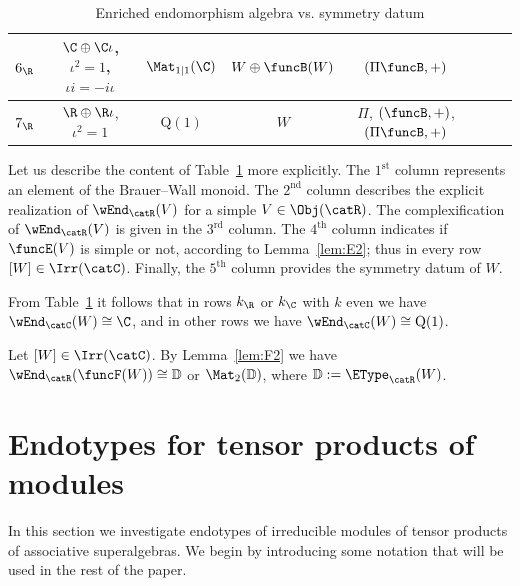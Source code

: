 \documentclass[12pt]{amsart}
\begin{document}
\begin{thm}
\begin{table}[ht]
\begin{tabular}{|c|c|c|c|c|c|c|c|}
\hline $6_\R$ & $\C\oplus\C\iota$, $\iota^2=1$, $\iota i=-i\iota$ & 
{$\Mat_{1|1}(\C)$} & $W\oplus \funcB(W)$ & 
{$(\Pi \funcB,+)$} \\

\hline $7_\R$ & $\R\oplus\R\iota$, $\iota^2=1$ & $\mathrm Q(1)$ & $W$ & $\Pi$, $(\funcB,+)$, 
$(\Pi\funcB,+)$
\\
\hline
\end{tabular}
\vspace{3mm}

\caption{\label{Table-1} Enriched endomorphism algebra vs. symmetry datum}
\vspace{-8mm}
\end{table}
\end{thm}




\begin{rmk}
Let us describe the content of Table~\ref{Table-1} more explicitly. The $1^\mathrm{st}$  column represents an element  of
the Brauer--Wall monoid.  The $2^\mathrm{nd}$ column describes the explicit realization of $\wEnd_\catR(V)$ for a simple $V\in\Obj(\catR)$. The   
complexification of $\wEnd_\catR(V)$ is given in the $3^\mathrm{rd}$ column. The $4^\mathrm{th}$ column
indicates if $\funcE(V)$ is simple or not, according to  Lemma~\ref{lem:E2}; thus in every row  $[W]\in\Irr(\catC)$. 
Finally, the $5^\mathrm{th}$ column provides the symmetry datum of $W$.  \end{rmk}




\begin{rmk}
\label{rmk:End(W)}
From Table~\ref{Table-1} it follows that in rows $k_\R$ or $k_\C$ with $k$ even we have $\wEnd_\catC(W)\cong \C$, and in other rows we have  
$\wEnd_\catC(W)\cong \mathrm{Q}(1)$.
\end{rmk}



\begin{rmk}
\label{rmk:endoDM2D}
Let  
$[W]\in\Irr(\catC)$. 
By Lemma~\ref{lem:F2} we have  $\wEnd_{\catR}(\funcF(W))\cong \mathbb D$ or $\Mat_2(\mathbb D)$, where  
$\mathbb D:=\EType_\catR(W)$. 
\end{rmk}






\section{Endotypes for tensor products of modules}
\label{sec:E-types-module}
In this section we investigate endotypes of  irreducible modules of  tensor products of  associative superalgebras. We begin by introducing some notation that will be used in the rest of the paper. 
\end{document}
